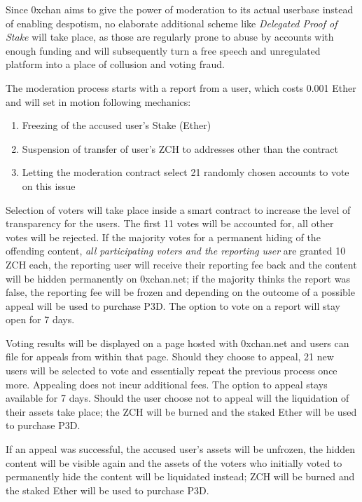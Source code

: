\documentclass[a4paper]{article}
\newcommand{\projectname}{0xchan}
\begin{document}
Since \projectname{} aims to give the power of moderation to its actual userbase instead of enabling despotism, no elaborate additional scheme like \emph{Delegated Proof of Stake} will take place, as those are regularly prone to abuse by accounts with enough funding and will subsequently turn a free speech and unregulated platform into a place of collusion and voting fraud.

The moderation process starts with a report from a user, which costs 0.001 Ether and will set in motion following mechanics:

\begin{enumerate}
    \item Freezing of the accused user's Stake (Ether)
    \item Suspension of transfer of user's ZCH to addresses other than the contract
    \item Letting the moderation contract select 21 randomly chosen accounts to vote on this issue
\end{enumerate}

Selection of voters will take place inside a smart contract to increase the level of transparency for the users. The first 11 votes will be accounted for, all other votes will be rejected. If the majority votes for a permanent hiding of the offending content, \emph{all participating voters and the reporting user} are granted 10 ZCH each, the reporting user will receive their reporting fee back and the content will be hidden permanently on 0xchan.net; if the majority thinks the report was false, the reporting fee will be frozen and depending on the outcome of a possible appeal will be used to purchase P3D. The option to vote on a report will stay open for 7 days.

Voting results will be displayed on a page hosted with 0xchan.net and users can file for appeals from within that page. Should they choose to appeal, 21 new users will be selected to vote and essentially repeat the previous process once more. Appealing does not incur additional fees. The option to appeal stays available for 7 days. Should the user choose not to appeal will the liquidation of their assets take place; the ZCH will be burned and the staked Ether will be used to purchase P3D.

If an appeal was successful, the accused user's assets will be unfrozen, the hidden content will be visible again and the assets of the voters who initially voted to permanently hide the content will be liquidated instead; ZCH will be burned and the staked Ether will be used to purchase P3D.
\end{document}
